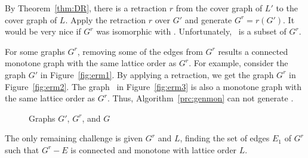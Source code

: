 By Theorem~\ref{thm:DR}, there is a retraction \(r\) from the cover graph of \(L'\) to the cover graph of \(L\)\@.
Apply the retraction \(r\) over \(G'\) and generate \(G^r = r(G')\)\@.
It would be very nice if \(G^r\) was isomorphic with \mG\@. Unfortunately, \mG\ is a subset of \(G^r\)\@.

For some graphs \(G^r\), removing some of the edges from \(G^r\) results a connected 
monotone graph with the same lattice order as \(G^r\)\@.
For example, consider the graph \(G'\) in
Figure~\ref{fig:erm1}\@. By applying a retraction, we get the
graph \(G^r\) in Figure~\ref{fig:erm2}\@. The graph
\mG\ in Figure~\ref{fig:erm3} is also a monotone graph with the same lattice order 
as \(G^r\)\@. Thus, Algorithm~\ref{prc:genmon} can not generate \mG\@. 

\begin{figure}
\hfill
\subfigure[\ensuremath{G'}]{\label{fig:erm1}}\hfill 
\subfigure[\ensuremath{G^r}]{\label{fig:erm2}}\hfill 
\subfigure[\ensuremath{G}]{\label{fig:erm3}}\hfill 
\caption{Graphs \ensuremath{G'}, \ensuremath{G^r}, and \ensuremath{G}}
\end{figure}

The only remaining challenge is given \(G^r\) and \(L\), 
finding the set of edges \(E_1\) of \(G^r\) such that 
\(G^r - E\) is connected and monotone with lattice order \(L\)\@.
